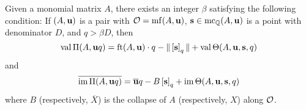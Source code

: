 \documentclass[11pt]{amsart}
\renewcommand{\!}[1]{{\color{red}\text{$\star$\,}#1\,$\star$}}
\newcommand{\ol}[1]{\overline{#1}}
\begin{document}
%
%
%


\begin{corollary}  
\label{uniform value and image: C}
Given a monomial matrix $A$, there exists an integer $\beta$ satisfying the following condition\textup:  If $(A, \mathbf{u})$ is a pair with $\mathcal{O} = \operatorname{mf}(A, \mathbf{u})$, $\mathbf{s} \in \operatorname{mc}_{\mathbb{Q}}(A, \mathbf{u})$ is a point with denominator $D$, and $q>\beta D$, then 
%
\[ \operatorname{val} \Pi(A, \mathbf{u}q) = \operatorname{ft}(A, \mathbf{u}) \cdot q - \| \left[ \mathbf{s} \right]_q \| + \operatorname{val} \Theta(A, \mathbf{u}, \mathbf{s}, q) \] 
%
and 
\[ \ol{\im \IP(A, \vv{u}q)} = \ol{\vv{u}} q - B \tail{\vv{s}}_q + \im \ip(A, \vv{u}, \vv{s}, q) \] 
where $B$ (respectively, $\ol{X}$) is the collapse of $A$  (respectively, $X$) along $\mathcal{O}$.
\end{corollary}
\end{document}
